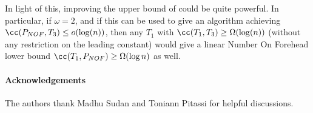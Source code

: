 In light of this, improving the upper bound of  could be quite powerful. In particular, if $\omega = 2$, and if this can be used to give an algorithm achieving $\cc(P_{NOF}, T_3) \leq o(\log(n))$, then any $T_1$ with $\cc(T_1, T_3) \geq \Omega(\log (n))$ (without any restriction on the leading constant) would give a linear Number On Forehead lower bound $\cc(T_1, P_{NOF}) \geq \Omega( \log n)$ as well.

\paragraph{Acknowledgements}
The authors thank Madhu Sudan and Toniann Pitassi for helpful discussions.